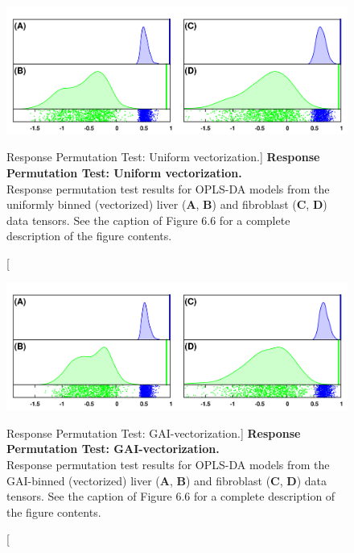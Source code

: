 \begin{figure}[ht!]
\includegraphics[width=6.5in]{figs/gaibin/08.png}
\caption
      [Response Permutation Test: Uniform vectorization.]{
  {\bf Response Permutation Test: Uniform vectorization.}
  \\
  Response permutation test results for OPLS-DA models from the uniformly
  binned (vectorized) liver ({\bf A}, {\bf B}) and fibroblast
  ({\bf C}, {\bf D}) data tensors. See the caption of Figure 6.6 for a
  complete description of the figure contents.
}
\end{figure}

\begin{figure}[ht!]
\includegraphics[width=6.5in]{figs/gaibin/09.png}
\caption
      [Response Permutation Test: GAI-vectorization.]{
  {\bf Response Permutation Test: GAI-vectorization.}
  \\
  Response permutation test results for OPLS-DA models from the GAI-binned
  (vectorized) liver ({\bf A}, {\bf B}) and fibroblast
  ({\bf C}, {\bf D}) data tensors. See the caption of Figure 6.6 for a
  complete description of the figure contents.
}
\end{figure}

\pagebreak



